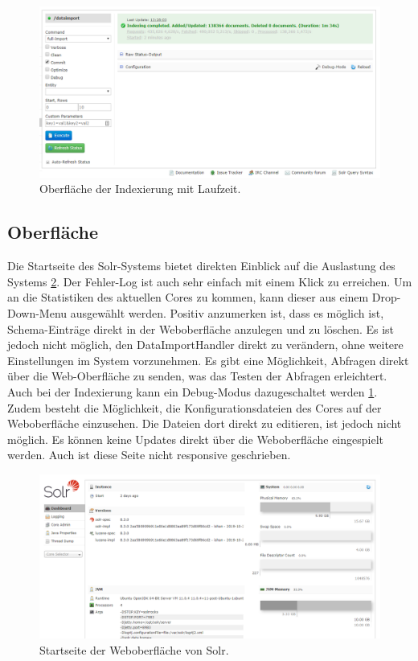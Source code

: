 \begin{figure}
	\centering
	\includegraphics[width=1\linewidth]{images/solr_indexing_time.png}
	\caption{Oberfläche der Indexierung mit Laufzeit.}
	\label{img:solrIndexTime}
\end{figure}

\subsection{Oberfläche}

Die Startseite des Solr-Systems bietet direkten Einblick auf die Auslastung des Systems \ref{img:solrInterface}. Der Fehler-Log ist auch sehr einfach mit einem Klick zu erreichen. Um an die Statistiken des aktuellen Cores zu kommen, kann dieser aus einem Drop-Down-Menu ausgewählt werden. Positiv anzumerken ist, dass es möglich ist, Schema-Einträge direkt in der Weboberfläche anzulegen und zu löschen. Es ist jedoch nicht möglich, den DataImportHandler direkt zu verändern, ohne weitere Einstellungen im System vorzunehmen. Es gibt eine Möglichkeit, Abfragen direkt über die Web-Oberfläche zu senden, was das Testen der Abfragen erleichtert. Auch bei der Indexierung kann ein Debug-Modus dazugeschaltet werden \ref{img:solrIndexTime}. Zudem besteht die Möglichkeit, die Konfigurationsdateien des Cores auf der Weboberfläche einzusehen. Die Dateien dort direkt zu editieren, ist jedoch nicht möglich.
Es können keine Updates direkt über die Weboberfläche eingespielt werden. Auch ist diese Seite nicht responsive geschrieben. 
\begin{figure}
	\centering
	\includegraphics[width=1\linewidth]{images/solr_interface.png}
	\caption{Startseite der Weboberfläche von Solr.}
	\label{img:solrInterface}
\end{figure}


